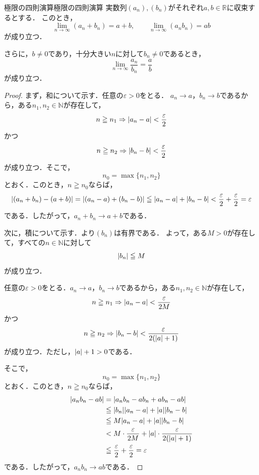 \begin{theorem}{極限の四則演算}{極限の四則演算}
  実数列$(a_n),(b_n)$がそれぞれ$a,b \in \mathbb{R}$に収束するとする．
  このとき，
  \[
    \lim_{n\to\infty}(a_n+b_n)=a+b,
    \qquad
    \lim_{n\to\infty}(a_nb_n)=ab
  \]
  が成り立つ．

  さらに，$b\ne 0$であり，十分大きい$n$に対して$b_n\ne 0$であるとき，
  \[
    \lim_{n\to\infty}\frac{a_n}{b_n}=\frac{a}{b}
  \]
  が成り立つ．
\end{theorem}

\begin{tleftbar}
  \begin{proof}
    まず，和について示す．任意の$\varepsilon>0$をとる．
    $a_n\to a$，$b_n\to b$であるから，ある$n_1,n_2\in\mathbb{N}$が存在して，
    \[
      n\geqq n_1
      \limp
      \abs{a_n-a}<\frac{\varepsilon}{2}
    \]
    かつ
    \[
      n\geqq n_2
      \limp
      \abs{b_n-b}<\frac{\varepsilon}{2}
    \]
    が成り立つ．そこで，
    \[
      n_0=\max\{n_1,n_2\}
    \]
    とおく．このとき，$n\geqq n_0$ならば，
    \[
      \abs{(a_n+b_n)-(a+b)}
      =\abs{(a_n-a)+(b_n-b)}
      \leqq \abs{a_n-a}+\abs{b_n-b}
      <\frac{\varepsilon}{2}+\frac{\varepsilon}{2}
      =\varepsilon
    \]
    である．したがって，$a_n+b_n\to a+b$である．

    次に，積について示す．より$(b_n)$は有界である．
    よって，ある$M>0$が存在して，すべての$n\in\mathbb{N}$に対して
    \[
      \lvert b_n\rvert\leqq M
    \]
    が成り立つ．

    任意の$\varepsilon>0$をとる．$a_n\to a$，$b_n\to b$であるから，ある$n_1,n_2\in\mathbb{N}$が存在して，
    \[
      n\geqq n_1
      \limp
      \abs{a_n-a}<\frac{\varepsilon}{2M}
    \]
    かつ
    \[
      n\geqq n_2
      \limp
      \abs{b_n-b}<\frac{\varepsilon}{2(\abs{a}+1)}
    \]
    が成り立つ．ただし，$\lvert a\rvert+1>0$である．

    そこで，
    \[
      n_0=\max\{n_1,n_2\}
    \]
    とおく．このとき，$n\geqq n_0$ならば，
    \begin{align*}
      \abs{a_nb_n-ab}
      &=\abs{a_nb_n-ab_n+ab_n-ab} \\
      &\leqq \abs{b_n}\abs{a_n-a}+\abs{a}\abs{b_n-b} \\
      &\leqq M\abs{a_n-a}+\abs{a}\abs{b_n-b} \\
      &< M\cdot\frac{\varepsilon}{2M}
        +\abs{a}\cdot\frac{\varepsilon}{2(\abs{a}+1)} \\
      &\leqq \frac{\varepsilon}{2}+\frac{\varepsilon}{2}
       =\varepsilon
    \end{align*}
    である．したがって，$a_nb_n\to ab$である．


\end{proof}
\end{tleftbar}
